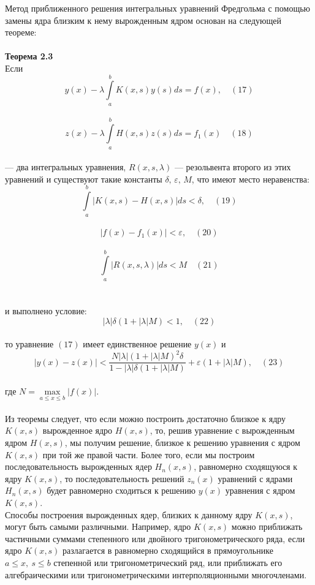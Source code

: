 \documentclass[12pt]{article}
\begin{document}
Метод приближенного решения интегральных уравнений Фредгольма с помощью замены ядра близким к нему вырожденным ядром основан на следующей теореме: \\
\\
\textbf{Теорема 2.3} \\

Если \\
$$ y(x) - \lambda\int\limits_a^b K(x,s)y(s)ds = f(x), \quad (17) $$\\
$$ z(x) - \lambda\int\limits_a^b H(x,s)z(s)ds = f_1(x) \quad (18) $$\\
— два интегральных уравнения, $ R(x,s,\lambda) $ — резольвента второго из этих уравнений и существуют такие константы $ \delta,\, \varepsilon, \, M $, что имеют место неравенства:\\
$$ \int\limits_a^b |K(x,s) - H(x,s)|ds < \delta, \quad (19) $$\\
$$ |f(x) - f_1(x)| < \varepsilon , \quad (20) $$\\
$$ \int\limits_a^b |R(x,s,\lambda)|ds < M \quad (21) $$\\
\\
и выполнено условие:\\
$$ |\lambda|\delta(1 + |\lambda|M)<1, \quad (22) $$\\
то уравнение $ (17) $ имеет единственное решение $ y(x) $ и \\
$$ |y(x) - z(x)| < \frac{N|\lambda|(1 + |\lambda|M)^2\delta}{1 - |\lambda|\delta(1 + |\lambda|M)} + \varepsilon(1 + |\lambda|M), \quad (23) $$ \\
где $ N = \max\limits_{a\leqslant x \leqslant b}|f(x)| $.\\
\\

Из теоремы следует, что если можно построить достаточно близкое к ядру $ K(x,s) $ вырожденное ядро $ H(x,s) $, то, решив уравнение с вырожденным ядром $ H(x,s) $, мы получим решение, близкое к решению уравнения с ядром $ K(x,s) $ при той же правой части. Более того, если мы построим последовательность вырожденных ядер 
$ H_n(x,s) $, равномерно сходящуюся к ядру $ K(x,s) $, то последовательность решений $ z_n(x) $ уравнений с ядрами $ H_n(x,s) $ будет равномерно сходиться к решению $ y(x) $ уравнения с ядром $ K(x,s) $.\\ 

Способы построения вырожденных ядер, близких к данному ядру $ K(x,s) $, могут быть самыми различными. Например, ядро $ K(x,s) $ можно приближать частичными суммами степенного или двойного тригонометрического ряда, если ядро $ K(x,s) $ разлагается в равномерно сходящийся в прямоугольнике $ a \leqslant x, \: s \leqslant b $ степенной или тригонометрический ряд, или приближать его алгебраическими или тригонометрическими интерполяционными многочленами.\\ 
\end{document}
